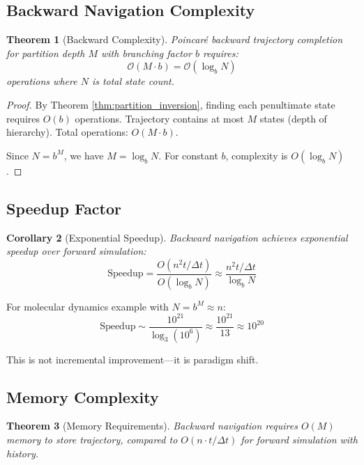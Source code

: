 \documentclass[twocolumn,10pt]{article}
\newtheorem{theorem}{Theorem}
\newtheorem{corollary}[theorem]{Corollary}
\begin{document}
\subsection{Backward Navigation Complexity}

\begin{theorem}[Backward Complexity]
\label{thm:backward_complexity}
Poincaré backward trajectory completion for partition depth $M$ with branching factor $b$ requires:
\begin{equation}
\mathcal{O}(M \cdot b) = \mathcal{O}(\log_b N)
\end{equation}
operations where $N$ is total state count.
\end{theorem}

\begin{proof}
By Theorem \ref{thm:partition_inversion}, finding each penultimate state requires $O(b)$ operations. Trajectory contains at most $M$ states (depth of hierarchy). Total operations: $O(M \cdot b)$.

Since $N = b^M$, we have $M = \log_b N$. For constant $b$, complexity is $O(\log_b N)$.
\end{proof}

\subsection{Speedup Factor}

\begin{corollary}[Exponential Speedup]
Backward navigation achieves exponential speedup over forward simulation:
\begin{equation}
\text{Speedup} = \frac{O(n^2 t/\Delta t)}{O(\log_b N)} \approx \frac{n^2 t/\Delta t}{\log_b N}
\end{equation}
\end{corollary}

For molecular dynamics example with $N = b^M \approx n$:
\begin{equation}
\text{Speedup} \sim \frac{10^{21}}{\log_3(10^6)} \approx \frac{10^{21}}{13} \approx 10^{20}
\end{equation}

This is not incremental improvement—it is paradigm shift.

\subsection{Memory Complexity}

\begin{theorem}[Memory Requirements]
Backward navigation requires $O(M)$ memory to store trajectory, compared to $O(n \cdot t/\Delta t)$ for forward simulation with history.
\end{theorem}
\end{document}
